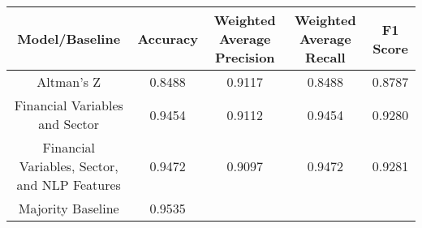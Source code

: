 \footnotesize
\begin{tabular}{ccccc}
\toprule
Model/Baseline & Accuracy & Weighted Average Precision & Weighted Average Recall & F1 Score \\
\midrule
Altman's Z & 0.8488 & 0.9117 & 0.8488 & 0.8787 \\
Financial Variables and Sector & 0.9454 & 0.9112 & 0.9454 & 0.9280 \\
Financial Variables, Sector, and NLP Features & 0.9472 & 0.9097 & 0.9472 & 0.9281 \\
Majority Baseline & 0.9535 &  &  &  \\
\bottomrule
\end{tabular}

\normalsize